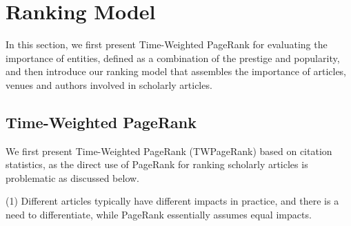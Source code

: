 \section{Ranking Model}
\label{sec-model}

In this section, we first present Time-Weighted PageRank for evaluating  the importance of entities, defined as a combination of the prestige and popularity, and then introduce our ranking model \ensemblerank that assembles the importance of articles, venues and authors involved in scholarly articles.
%



\subsection{Time-Weighted PageRank}
\label{subsec-twpr}

We first present Time-Weighted PageRank (TWPageRank) based on citation statistics, as the direct use of PageRank for ranking scholarly articles is problematic as discussed below.







\noindent(1) Different articles typically have different impacts in practice, and there is a need to differentiate, while PageRank essentially assumes equal impacts.


